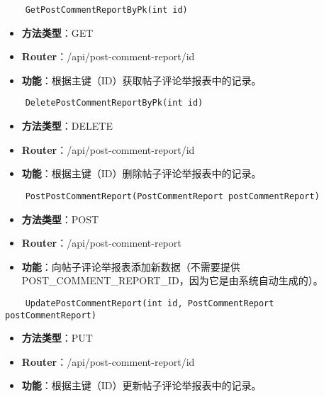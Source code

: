 \begin{verbatim}
	GetPostCommentReportByPk(int id)
\end{verbatim}

\begin{itemize}
	\item \textbf{方法类型}：GET
	\item \textbf{Router}：/api/post-comment-report/{id}
	\item \textbf{功能}：根据主键（ID）获取帖子评论举报表中的记录。
\end{itemize}

\begin{verbatim}
	DeletePostCommentReportByPk(int id)
\end{verbatim}

\begin{itemize}
	\item \textbf{方法类型}：DELETE
	\item \textbf{Router}：/api/post-comment-report/{id}
	\item \textbf{功能}：根据主键（ID）删除帖子评论举报表中的记录。
\end{itemize}

\begin{verbatim}
	PostPostCommentReport(PostCommentReport postCommentReport)
\end{verbatim}

\begin{itemize}
	\item \textbf{方法类型}：POST
	\item \textbf{Router}：/api/post-comment-report
	\item \textbf{功能}：向帖子评论举报表添加新数据（不需要提供 POST\_COMMENT\_REPORT\_ID，因为它是由系统自动生成的）。
\end{itemize}

\begin{verbatim}
	UpdatePostCommentReport(int id, PostCommentReport postCommentReport)
\end{verbatim}

\begin{itemize}
	\item \textbf{方法类型}：PUT
	\item \textbf{Router}：/api/post-comment-report/{id}
	\item \textbf{功能}：根据主键（ID）更新帖子评论举报表中的记录。
\end{itemize}


